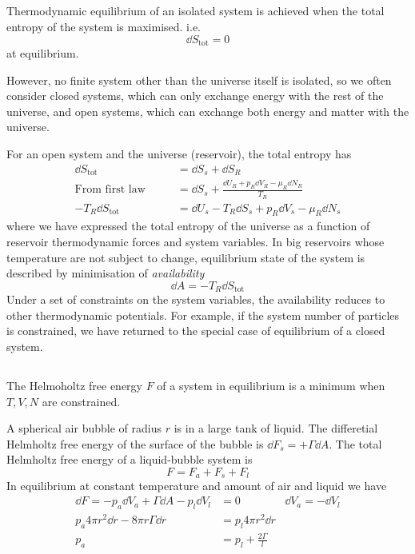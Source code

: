 \documentclass[12pt]{article}
\begin{document}
        \subsection{} Thermodynamic equilibrium of an isolated system is achieved when the total entropy of the system is maximised. i.e. \[
            \dd{S}_\text{tot} = 0
        \]
        at equilibrium. 

        However, no finite system other than the universe itself is isolated, so we often consider closed systems, which can only exchange energy with the rest of the universe, and open systems, which can exchange both energy and matter with the universe.
        
        For an open system and the universe (reservoir), the total entropy has
        \begin{align*}
            \dd{S}_\text{tot} &= \dd{S}_s + \dd{S}_R\\
            \text{From first law}\qquad &=  \dd{S}_s + \frac{\dd{U}_R+p_R\dd V_R-\mu_R \dd{N}_R}{T_R} \\
            -T_R \dd{S}_\text{tot} &= \dd{U}_s-T_R \dd{S}_s +p_R\dd V_s -\mu_R \dd{N}_s 
        \end{align*}
        where we have expressed the total entropy of the universe as a function of reservoir thermodynamic forces and system variables. In big reservoirs whose temperature are not subject to change, equilibrium state of the system is described by minimisation of \textit{availability} \[
            \dd{A} = - T_R \dd{S}_\text{tot}
        \]
        Under a set of constraints on the system variables, the availability reduces to other thermodynamic potentials. For example, if the system number of particles is constrained, we have returned to the special case of equilibrium of a closed system.
        \subsection{} The Helmoholtz free energy $F$ of a system in equilibrium is a minimum when $T,V,N$ are constrained.

        A spherical air bubble of radius \(r\) is in a large tank of liquid. The differetial Helmholtz free energy of the surface of the bubble is \( \dd F_s = + \Gamma \dd A\). The total Helmholtz free energy of a liquid-bubble system is
        \[
            F = F_a + F_s + F_l
        \]
        In equilibrium at constant temperature and amount of air and liquid we have \begin{align*}
            \dd F = - p_a \dd V_a + \Gamma \dd A - p_l \dd V_l &= 0& \dd V_a =- \dd V_l\\
            p_a 4\pi r^2 \dd r - 8\pi r \Gamma \dd r &= p_l 4\pi r^2 \dd r\\
            p_a &=  p_l +  \frac{2\Gamma}{l}
        \end{align*}
\end{document}
